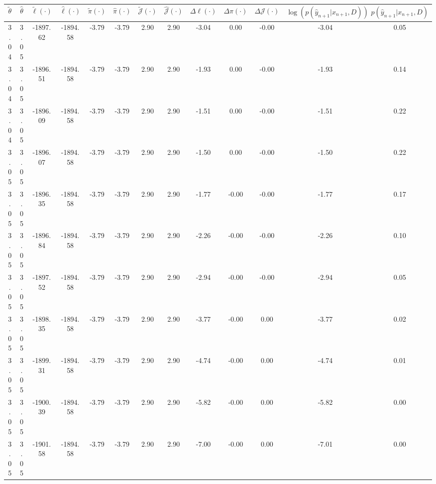 \begin{table}[htbp]
        \centering
        \tiny
        \begin{adjustbox}{angle=90}
            \begin{tabular}{|c|c|c|c|c|c|c|c|c|c|c|c|c|}
                \hline
                 $\tilde{\theta}$ & $\hat{\theta}$ & $\tilde{\ell}(\cdot)$ & $\hat{\ell}(\cdot)$ & $\tilde{\pi}(\cdot)$ & $\hat{\pi}(\cdot)$ & $\tilde{\mathcal{J}}(\cdot)$ & $\hat{\mathcal{J}}(\cdot)$ & $\Delta \ell(\cdot)$ & $\Delta \pi(\cdot)$ & $\Delta \mathcal{J}(\cdot)$ & $\log(p(\hat{y}_{n+1}|x_{n+1}, D))$ & $p(\hat{y}_{n+1}|x_{n+1}, D)$ \\
                \hline
                 3.04 & 3.05 & -1897.62 & -1894.58 & -3.79 & -3.79 & 2.90 & 2.90 & -3.04 & 0.00 & -0.00 & -3.04 & 0.05\\ \hline
 3.04 & 3.05 & -1896.51 & -1894.58 & -3.79 & -3.79 & 2.90 & 2.90 & -1.93 & 0.00 & -0.00 & -1.93 & 0.14\\ \hline
 3.04 & 3.05 & -1896.09 & -1894.58 & -3.79 & -3.79 & 2.90 & 2.90 & -1.51 & 0.00 & -0.00 & -1.51 & 0.22\\ \hline
 3.05 & 3.05 & -1896.07 & -1894.58 & -3.79 & -3.79 & 2.90 & 2.90 & -1.50 & 0.00 & -0.00 & -1.50 & 0.22\\ \hline
 3.05 & 3.05 & -1896.35 & -1894.58 & -3.79 & -3.79 & 2.90 & 2.90 & -1.77 & -0.00 & -0.00 & -1.77 & 0.17\\ \hline
 3.05 & 3.05 & -1896.84 & -1894.58 & -3.79 & -3.79 & 2.90 & 2.90 & -2.26 & -0.00 & -0.00 & -2.26 & 0.10\\ \hline
 3.05 & 3.05 & -1897.52 & -1894.58 & -3.79 & -3.79 & 2.90 & 2.90 & -2.94 & -0.00 & -0.00 & -2.94 & 0.05\\ \hline
 3.05 & 3.05 & -1898.35 & -1894.58 & -3.79 & -3.79 & 2.90 & 2.90 & -3.77 & -0.00 & 0.00 & -3.77 & 0.02\\ \hline
 3.05 & 3.05 & -1899.31 & -1894.58 & -3.79 & -3.79 & 2.90 & 2.90 & -4.74 & -0.00 & 0.00 & -4.74 & 0.01\\ \hline
 3.05 & 3.05 & -1900.39 & -1894.58 & -3.79 & -3.79 & 2.90 & 2.90 & -5.82 & -0.00 & 0.00 & -5.82 & 0.00\\ \hline
 3.05 & 3.05 & -1901.58 & -1894.58 & -3.79 & -3.79 & 2.90 & 2.90 & -7.00 & -0.00 & 0.00 & -7.01 & 0.00\\ \hline
            \end{tabular}
        \end{adjustbox}
        \caption{}
        \label{}
    \end{table}
    